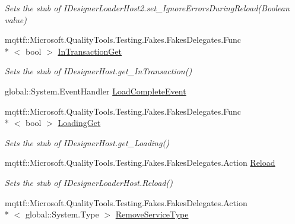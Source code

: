 \begin{DoxyCompactItemize}
\begin{DoxyCompactList}\small\item\em Sets the stub of I\-Designer\-Loader\-Host2.\-set\-\_\-\-Ignore\-Errors\-During\-Reload(\-Boolean value)\end{DoxyCompactList}\item 
mqttf\-::\-Microsoft.\-Quality\-Tools.\-Testing.\-Fakes.\-Fakes\-Delegates.\-Func\\*
$<$ bool $>$ \hyperlink{class_system_1_1_component_model_1_1_design_1_1_serialization_1_1_fakes_1_1_stub_i_designer_loader_host2_aa629e7dc8ef1a2bee4c4e72ba7ca0edd}{In\-Transaction\-Get}
\begin{DoxyCompactList}\small\item\em Sets the stub of I\-Designer\-Host.\-get\-\_\-\-In\-Transaction()\end{DoxyCompactList}\item 
global\-::\-System.\-Event\-Handler \hyperlink{class_system_1_1_component_model_1_1_design_1_1_serialization_1_1_fakes_1_1_stub_i_designer_loader_host2_a182bf53ce635107d68131ba1435ab8dc}{Load\-Complete\-Event}
\item 
mqttf\-::\-Microsoft.\-Quality\-Tools.\-Testing.\-Fakes.\-Fakes\-Delegates.\-Func\\*
$<$ bool $>$ \hyperlink{class_system_1_1_component_model_1_1_design_1_1_serialization_1_1_fakes_1_1_stub_i_designer_loader_host2_ad994b3b6196b4876546cacfd627a1c5e}{Loading\-Get}
\begin{DoxyCompactList}\small\item\em Sets the stub of I\-Designer\-Host.\-get\-\_\-\-Loading()\end{DoxyCompactList}\item 
mqttf\-::\-Microsoft.\-Quality\-Tools.\-Testing.\-Fakes.\-Fakes\-Delegates.\-Action \hyperlink{class_system_1_1_component_model_1_1_design_1_1_serialization_1_1_fakes_1_1_stub_i_designer_loader_host2_a8ebe01f2a7725bfd1957bcfe25ac8d23}{Reload}
\begin{DoxyCompactList}\small\item\em Sets the stub of I\-Designer\-Loader\-Host.\-Reload()\end{DoxyCompactList}\item 
mqttf\-::\-Microsoft.\-Quality\-Tools.\-Testing.\-Fakes.\-Fakes\-Delegates.\-Action\\*
$<$ global\-::\-System.\-Type $>$ \hyperlink{class_system_1_1_component_model_1_1_design_1_1_serialization_1_1_fakes_1_1_stub_i_designer_loader_host2_a705f5569dfbcf9e3aaacdc997d27eff7}{Remove\-Service\-Type}

\end{DoxyCompactItemize}
